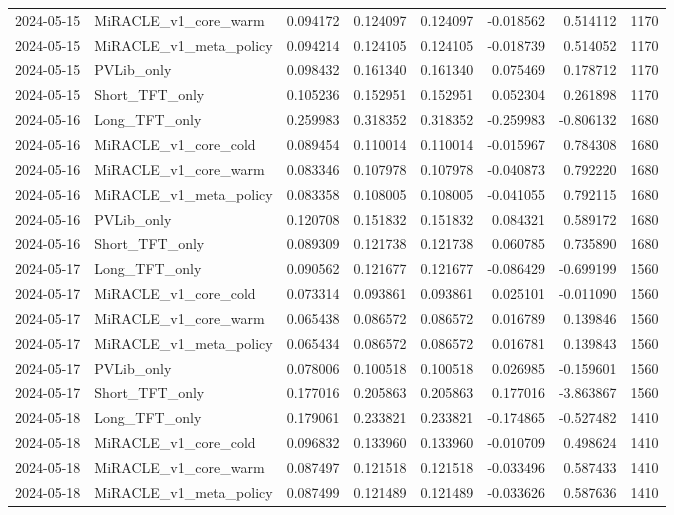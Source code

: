 \begin{tabular}{llrrrrrr}
2024-05-15 & MiRACLE_v1_core_warm & 0.094172 & 0.124097 & 0.124097 & -0.018562 & 0.514112 & 1170 \\
2024-05-15 & MiRACLE_v1_meta_policy & 0.094214 & 0.124105 & 0.124105 & -0.018739 & 0.514052 & 1170 \\
2024-05-15 & PVLib_only & 0.098432 & 0.161340 & 0.161340 & 0.075469 & 0.178712 & 1170 \\
2024-05-15 & Short_TFT_only & 0.105236 & 0.152951 & 0.152951 & 0.052304 & 0.261898 & 1170 \\
2024-05-16 & Long_TFT_only & 0.259983 & 0.318352 & 0.318352 & -0.259983 & -0.806132 & 1680 \\
2024-05-16 & MiRACLE_v1_core_cold & 0.089454 & 0.110014 & 0.110014 & -0.015967 & 0.784308 & 1680 \\
2024-05-16 & MiRACLE_v1_core_warm & 0.083346 & 0.107978 & 0.107978 & -0.040873 & 0.792220 & 1680 \\
2024-05-16 & MiRACLE_v1_meta_policy & 0.083358 & 0.108005 & 0.108005 & -0.041055 & 0.792115 & 1680 \\
2024-05-16 & PVLib_only & 0.120708 & 0.151832 & 0.151832 & 0.084321 & 0.589172 & 1680 \\
2024-05-16 & Short_TFT_only & 0.089309 & 0.121738 & 0.121738 & 0.060785 & 0.735890 & 1680 \\
2024-05-17 & Long_TFT_only & 0.090562 & 0.121677 & 0.121677 & -0.086429 & -0.699199 & 1560 \\
2024-05-17 & MiRACLE_v1_core_cold & 0.073314 & 0.093861 & 0.093861 & 0.025101 & -0.011090 & 1560 \\
2024-05-17 & MiRACLE_v1_core_warm & 0.065438 & 0.086572 & 0.086572 & 0.016789 & 0.139846 & 1560 \\
2024-05-17 & MiRACLE_v1_meta_policy & 0.065434 & 0.086572 & 0.086572 & 0.016781 & 0.139843 & 1560 \\
2024-05-17 & PVLib_only & 0.078006 & 0.100518 & 0.100518 & 0.026985 & -0.159601 & 1560 \\
2024-05-17 & Short_TFT_only & 0.177016 & 0.205863 & 0.205863 & 0.177016 & -3.863867 & 1560 \\
2024-05-18 & Long_TFT_only & 0.179061 & 0.233821 & 0.233821 & -0.174865 & -0.527482 & 1410 \\
2024-05-18 & MiRACLE_v1_core_cold & 0.096832 & 0.133960 & 0.133960 & -0.010709 & 0.498624 & 1410 \\
2024-05-18 & MiRACLE_v1_core_warm & 0.087497 & 0.121518 & 0.121518 & -0.033496 & 0.587433 & 1410 \\
2024-05-18 & MiRACLE_v1_meta_policy & 0.087499 & 0.121489 & 0.121489 & -0.033626 & 0.587636 & 1410 \\

\end{tabular}
